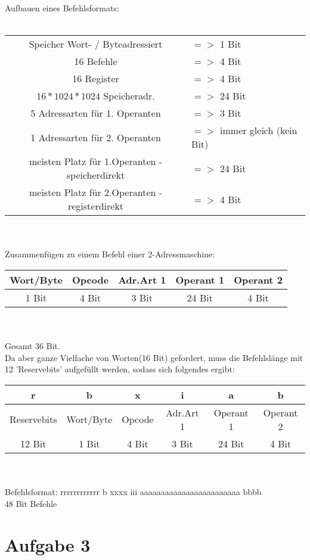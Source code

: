\documentclass[12pt,a4paper]{scrartcl}
\begin{document}
	Aufbauen eines Befehlsformats: \\
	\\
	\begin{tabular}{c l}
		Speicher Wort- / Byteadressiert &$=>$ 1 Bit\\
		16 Befehle &$=>$ 4 Bit \\
		16 Register &$=>$ 4 Bit \\
		$16*1024*1024$ Speicheradr. &$=>$ 24 Bit \\
		5 Adressarten für 1. Operanten &$=>$ 3 Bit \\
		1 Adressarten für 2. Operanten &$=>$ immer gleich (kein Bit) \\
		meisten Platz für 1.Operanten - speicherdirekt &$=>$ 24 Bit \\
		meisten Platz für 2.Operanten - registerdirekt &$=>$ 4 Bit \\
	\end{tabular} \\
	\\
	Zusammenfügen zu einem Befehl einer 2-Adressmaschine: \\
	\begin{tabular}{c | c | c | c | c}
		Wort/Byte & Opcode & Adr.Art 1 & Operant 1 & Operant 2 \\
		\hline
		1 Bit & 4 Bit & 3 Bit & 24 Bit & 4 Bit
	\end{tabular} \\
	\\
	Gesamt 36 Bit. \\
	Da aber ganze Vielfache von Worten(16 Bit) gefordert, muss die Befehlslänge mit 12  'Reservebits' aufgefüllt werden, sodass sich folgendes ergibt: \\
	\begin{tabular}{c | c | c | c | c | c}
		r & b & x & i & a & b \\
		\hline
		Reservebits & Wort/Byte & Opcode & Adr.Art 1 & Operant 1 & Operant 2 \\
		\hline
		12 Bit & 1 Bit & 4 Bit & 3 Bit & 24 Bit & 4 Bit
	\end{tabular} \\
	\\
	Befehlsformat: rrrrrrrrrrrr b xxxx iii aaaaaaaaaaaaaaaaaaaaaaaa bbbb \\
	48 Bit Befehle 
	
	\newpage
		
	\section*{Aufgabe 3}
	
\end{document}
